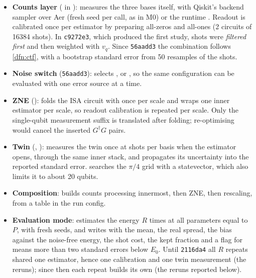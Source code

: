 \begin{itemize}
  \item \textbf{Counts layer} ( in ): measures the three
    bases itself, with Qiskit's backend sampler over Aer (fresh seed per call, as in M0) or the runtime
    . Readout is calibrated once per estimator by preparing all-zeros and all-ones
    (2 circuits of 16384 shots). In \texttt{c9272e3}, which produced the first study, shots were
    \emph{filtered first} and then weighted with $v_q$. Since \texttt{56aadd3} the combination
    follows \cref{dfn:ctf}, with a bootstrap standard error from 50 resamples of the shots.
  \item \textbf{Noise switch} (\texttt{56aadd3}):  selects ,
     or , so the same configuration can be evaluated with one error source
    at a time.
  \item \textbf{ZNE} (): folds the ISA circuit with
     once per scale and wraps one inner estimator per scale, so
    readout calibration is repeated per scale. Only the single-qubit measurement suffix is
    translated after folding; re-optimising would cancel the inserted $G^\dagger G$ pairs.
  \item \textbf{Twin} (, ): measures the twin once at
    \VMbTwinShots{} shots per basis when the estimator opens, through the same inner stack, and
    propagates its uncertainty into the reported standard error.  searches the
    $\pi/4$ grid with a statevector, which also limits it to about 20 qubits.
  \item \textbf{Composition}:  builds counts processing innermost, then ZNE,
    then rescaling, from a \py{[mitigation]} table in the run config.
  \item \textbf{Evaluation mode}: 
    estimates the energy $R$ times at all parameters equal to $P$, with fresh seeds, and writes
     with the mean, the real spread, the bias against the noise-free energy,
    the shot cost, the kept fraction and a  flag for means more than two
    standard errors below $E_0$. Until \texttt{2116da4} all $R$ repeats shared one estimator,
    hence one calibration and one twin measurement (the  reruns); since then each repeat
    builds its own (the  reruns reported below).
\end{itemize}

